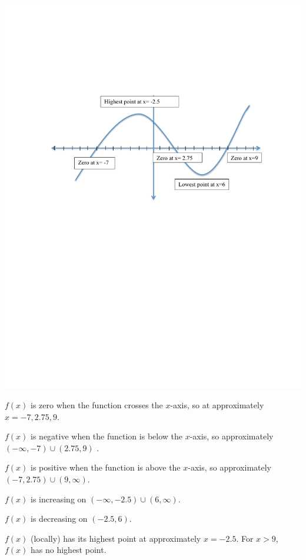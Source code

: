 \documentclass[handout,nooutcomes]{ximera}
\begin{document}
\begin{problem}
		\begin{freeResponse}
			\begin{image}
			\includegraphics[trim= 250 410 250 160]{Figure3.pdf}
			\end{image}
			
			$f(x)$ is zero when the function crosses the $x$-axis, so at approximately $x=-7,2.75,9$. 
			
			$f(x)$ is negative when the function is below the $x$-axis, so approximately $(-\infty ,-7) \cup (2.75,9)$ .
			
			$f(x)$ is positive when the function is above the $x$-axis, so approximately $(-7,2.75) \cup (9,\infty )$. 
			
			$f(x)$ is increasing on $(-\infty ,-2.5) \cup (6,\infty )$. 
			
			$f(x)$ is decreasing on $(-2.5,6)$.
			
			$f(x)$ (locally) has its highest point at approximately $x=-2.5$.  For $x > 9$, $f(x)$ has no highest point.
			 

\end{freeResponse}
\end{problem}
\end{document}
